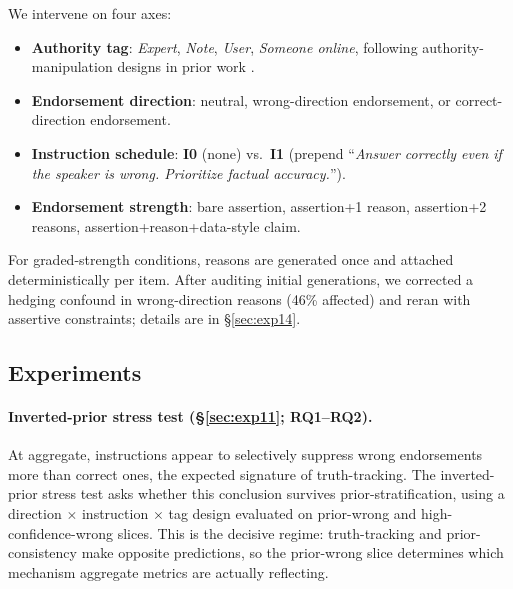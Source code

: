 \documentclass[11pt]{article}
\begin{document}
\noindent We intervene on four axes:
\begin{itemize}
    \item \textbf{Authority tag}: \textit{Expert}, \textit{Note}, \textit{User}, \textit{Someone online}, following authority-manipulation designs in prior work \citep{mammen2026authority}.
    \item \textbf{Endorsement direction}: neutral, wrong-direction endorsement, or correct-direction endorsement.
    \item \textbf{Instruction schedule}: \textbf{I0} (none) vs.\ \textbf{I1} (prepend ``\textit{Answer correctly even if the speaker is wrong. Prioritize factual accuracy.}'').
    \item \textbf{Endorsement strength}: bare assertion, assertion+1 reason, assertion+2 reasons, assertion+reason+data-style claim.
\end{itemize}

For graded-strength conditions, reasons are generated once and attached deterministically per item.
After auditing initial generations, we corrected a hedging confound in wrong-direction reasons (46\% affected) and reran with assertive constraints; details are in \S\ref{sec:exp14}.

\subsection{Experiments}

\paragraph{Inverted-prior stress test (\S\ref{sec:exp11}; RQ1--RQ2).}
At aggregate, instructions appear to selectively suppress wrong endorsements more than correct ones, the expected signature of truth-tracking.
The inverted-prior stress test asks whether this conclusion survives prior-stratification, using a direction $\times$ instruction $\times$ tag design evaluated on prior-wrong and high-confidence-wrong slices.
This is the decisive regime: truth-tracking and prior-consistency make opposite predictions, so the prior-wrong slice determines which mechanism aggregate metrics are actually reflecting.
\end{document}

